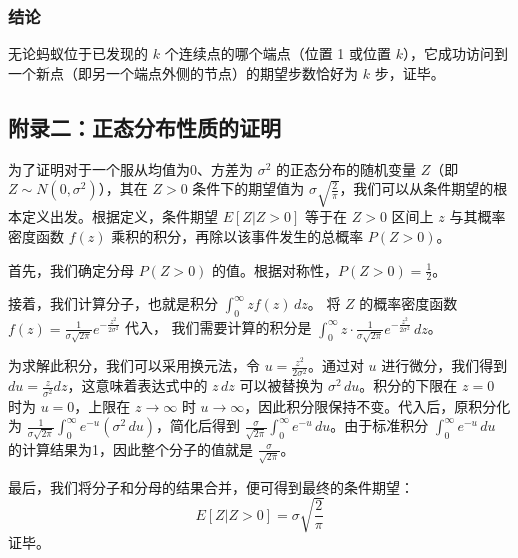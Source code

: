 \documentclass[UTF8]{ctexart}
\begin{document}
\subsubsection*{结论}
无论蚂蚁位于已发现的 $k$ 个连续点的哪个端点（位置 1 或位置 $k$），它成功访问到一个新点（即另一个端点外侧的节点）的期望步数恰好为 $k$ 步，证毕。


\subsection*{附录二：正态分布性质的证明}
为了证明对于一个服从均值为0、方差为 $\sigma^2$ 的正态分布的随机变量 $Z$（即 $Z \sim N(0, \sigma^2)$），其在 $Z>0$ 条件下的期望值为 $\sigma \sqrt{\frac{2}{\pi}}$，我们可以从条件期望的根本定义出发。根据定义，条件期望 $E[Z | Z>0]$ 等于在 $Z>0$ 区间上 $z$ 与其概率密度函数 $f(z)$ 乘积的积分，再除以该事件发生的总概率 $P(Z>0)$。

首先，我们确定分母 $P(Z>0)$ 的值。根据对称性，$P(Z>0) = \frac{1}{2}$。

接着，我们计算分子，也就是积分 $\int_{0}^{\infty} z f(z) \,dz$。
将 $Z$ 的概率密度函数 $f(z) = \frac{1}{\sigma\sqrt{2\pi}} e^{-\frac{z^2}{2\sigma^2}}$ 代入，
我们需要计算的积分是 $\int_{0}^{\infty} z \cdot \frac{1}{\sigma\sqrt{2\pi}} e^{-\frac{z^2}{2\sigma^2}} \,dz$。

为求解此积分，我们可以采用换元法，令 $u = \frac{z^2}{2\sigma^2}$。通过对 $u$ 进行微分，我们得到 $du = \frac{z}{\sigma^2} dz$，这意味着表达式中的 $z \,dz$ 可以被替换为 $\sigma^2 \,du$。积分的下限在 $z=0$ 时为 $u=0$，上限在 $z \to \infty$ 时 $u \to \infty$，因此积分限保持不变。代入后，原积分化为 $\frac{1}{\sigma\sqrt{2\pi}} \int_{0}^{\infty} e^{-u} (\sigma^2 \,du)$，简化后得到 $\frac{\sigma}{\sqrt{2\pi}} \int_{0}^{\infty} e^{-u} \,du$。由于标准积分 $\int_{0}^{\infty} e^{-u} \,du$ 的计算结果为1，因此整个分子的值就是 $\frac{\sigma}{\sqrt{2\pi}}$。

最后，我们将分子和分母的结果合并，便可得到最终的条件期望：
$$
E[Z | Z>0] = \sigma \sqrt{\frac{2}{\pi}}
$$
证毕。
\end{document}
